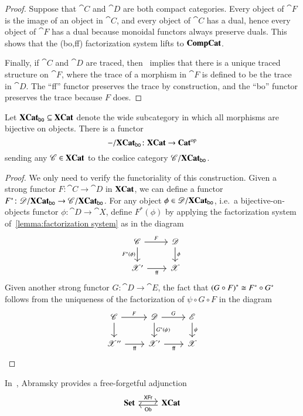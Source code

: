 \documentclass[12pt,oneside,article,draft]{memoir}
\begin{document}
\begin{proof}
	Suppose that $\cat{C}$ and $\cat{D}$ are both compact categories.
	Every object of $\cat{F}$ is the image of an object in $\cat{C}$, and every object of $\cat{C}$ has a dual, hence every object of $\cat{F}$ has a dual because monoidal functors always preserve duals.
	This shows that the (bo,ff) factorization system lifts to $\mathbf{CompCat}$.

	Finally, if $\cat{C}$ and $\cat{D}$ are traced, then~\cite[Proposition 2.4]{JoyalStreetVertity} implies that there is a unique traced structure on $\cat{F}$, where the trace of a morphism in $\cat{F}$ is defined to be the trace in $\cat{D}$.
	The ``ff'' functor preserves the trace by construction, and the ``bo'' functor preserves the trace because $F$ does.
\end{proof}

\begin{proposition}\label{prop:coslice Xbo}
	Let $\mathbf{XCat}_{\mathsf{bo}}\subseteq\mathbf{XCat}$ denote the wide subcategory in which all morphisms are bijective on objects.
	There is a functor 
	$$-/\mathbf{XCat}_{\mathsf{bo}}\colon\mathbf{XCat}\to{\mathbf{Cat}}^{\text{op}}$$
	sending any $\mathscr{C}\in\mathbf{XCat}$ to the coslice category $\mathscr{C}/\mathbf{XCat}_{\mathsf{bo}}$.
\end{proposition}
\begin{proof}
	We only need to verify the functoriality of this construction.
	Given a strong functor $F\colon\cat{C}\to\cat{D}$ in $\mathbf{XCat}$, we can define a functor $F^*\colon\mathscr{D}/\mathbf{XCat}_{\mathsf{bo}}\to\mathscr{C}/\mathbf{XCat}_{\mathsf{bo}}$.
	For any object $\phi\in\mathscr{D}/\mathbf{XCat}_{\mathsf{bo}}$, i.e.~a bijective-on-objects functor $\phi\colon\cat{D}\to\cat{X}$, define $F^*(\phi)$ by applying the factorization system of~\ref{lemma:factorization system} as in the diagram
	\[
	\begin{tikzcd}
		\cat{C} \ar[r,"F"] \ar[d,"F^*(\phi)"'] & \cat{D} \ar[d,"\phi"] \\
		\cat{X}' \ar[r,"\ff"'] & \cat{X}
	\end{tikzcd}
	\]
	Given another strong functor $G\colon\cat{D}\to\cat{E}$, the fact that ${(G\circ F)}^*\cong F^*\circ G^*$ follows from the uniqueness of the factorization of $\psi\circ G\circ F$ in the diagram
	\[
	\begin{tikzcd}
		\cat{C} \ar[r,"F"] \ar[d] 
			& \cat{D} \ar[r,"G"] \ar[d,"G^*(\psi)"] 
		    & \cat{E} \ar[d,"\psi"] \\
		\cat{X}'' \ar[r,"\ff"'] & \cat{X}' \ar[r,"\ff"'] & \cat{X}
	\end{tikzcd}
	\]
\end{proof}

In~\cite{Abramsky2}, Abramsky provides a free-forgetful adjunction
\begin{equation}\label{eq:abramsky}
\begin{tikzcd}
	\Cat{Set}\arrow[r, shift left=.5ex, "\Fun{XFr}"]&\XCat\arrow[l, shift left=.5ex,"\Ob"]
\end{tikzcd}
\end{equation}
\end{document}
